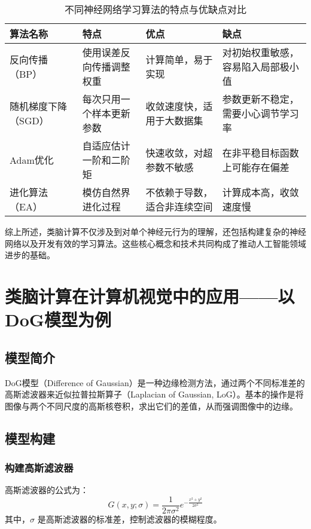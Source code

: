 \documentclass[a4paper,12pt]{article}
\begin{document}
\begin{table}[h]
\centering
\begin{tabular}{l|p{3cm}|p{3cm}|p{3cm}}
\toprule
算法名称 & 特点 & 优点 & 缺点 \\
\midrule
反向传播（BP）\cite{lillicrap2020backpropagation} & 使用误差反向传播调整权重 & 计算简单，易于实现 & 对初始权重敏感，容易陷入局部极小值 \\
随机梯度下降（SGD）\cite{bottou2012stochastic} & 每次只用一个样本更新参数 & 收敛速度快，适用于大数据集 & 参数更新不稳定，需要小心调节学习率 \\
Adam优化\cite{kingma2014adam} & 自适应估计一阶和二阶矩 & 快速收敛，对超参数不敏感 & 在非平稳目标函数上可能存在偏差 \\
进化算法（EA）\cite{back1993overview} & 模仿自然界进化过程 & 不依赖于导数，适合非连续空间 & 计算成本高，收敛速度慢 \\
\bottomrule
\end{tabular}
\caption{不同神经网络学习算法的特点与优缺点对比}
\label{tab:learning_algorithms}
\end{table}

综上所述，类脑计算不仅涉及到对单个神经元行为的理解，还包括构建复杂的神经网络以及开发有效的学习算法。这些核心概念和技术共同构成了推动人工智能领域进步的基础。


\section{类脑计算在计算机视觉中的应用——以DoG模型为例}
\subsection{模型简介}

DoG模型（Difference of Gaussian）\cite{wang2012improved}是一种边缘检测方法，通过两个不同标准差的高斯滤波器来近似拉普拉斯算子（Laplacian of Gaussian, LoG）。基本的操作是将图像与两个不同尺度的高斯核卷积，求出它们的差值，从而强调图像中的边缘。

\subsection{模型构建}

\subsubsection{构建高斯滤波器}

高斯滤波器的公式为：
\begin{equation}
G(x, y; \sigma) = \frac{1}{2\pi\sigma^2} e^{-\frac{x^2 + y^2}{2\sigma^2}}
\end{equation}
其中，$\sigma$ 是高斯滤波器的标准差，控制滤波器的模糊程度。
\end{document}
